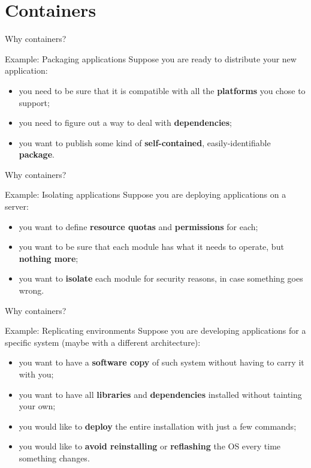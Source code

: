
\section{Containers}
\graphicspath{{figs/section1/}}

\begin{frame}{Why containers?}
	\begin{exampleblock}{Example: Packaging applications}
		Suppose you are ready to distribute your new application:
		\begin{itemize}
			\item you need to be sure that it is compatible with all the \textbf{platforms} you chose to support;
			\item you need to figure out a way to deal with \textbf{dependencies};
			\item you want to publish some kind of \textbf{self-contained}, easily-identifiable \textbf{package}.
		\end{itemize}
	\end{exampleblock}
\end{frame}
\begin{frame}{Why containers?}
	\begin{exampleblock}{Example: Isolating applications}
		Suppose you are deploying applications on a server:
		\begin{itemize}
			\item you want to define \textbf{resource quotas} and \textbf{permissions} for each;
			\item you want to be sure that each module has what it needs to operate, but \textbf{nothing more};
			\item you want to \textbf{isolate} each module for security reasons, in case something goes wrong.
		\end{itemize}
	\end{exampleblock}
\end{frame}
\begin{frame}{Why containers?}
	\begin{exampleblock}{Example: Replicating environments}
		Suppose you are developing applications for a specific system (maybe with a different architecture):
		\begin{itemize}
			\item you want to have a \textbf{software copy} of such system without having to carry it with you;
			\item you want to have all \textbf{libraries} and \textbf{dependencies} installed without tainting your own;
			\item you would like to \textbf{deploy} the entire installation with just a few commands;
			\item you would like to \textbf{avoid reinstalling} or \textbf{reflashing} the OS every time something changes.
		\end{itemize}
	\end{exampleblock}
\end{frame}
